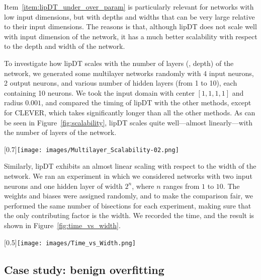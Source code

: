 \documentclass[11pt,times]{article}
\begin{document}
Item~\ref{item:lipDT_under_over_param} is particularly relevant for
networks with low input dimensions, but with depths and widths that
can be very large relative to their input dimensions. The reasons is
that, although lipDT does not scale well with input dimension of the
network, it has a much better scalability with respect to the depth
and width of the network.



To investigate how lipDT scales with the number of layers ({\ie},
depth) of the network, we generated some multilayer networks randomly
with 4 input neurons, 2 output neurons, and various number of hidden
layers (from 1 to 10), each containing 10 neurons. We took the input
domain with center $[1,1,1,1]$ and radius $0.001$, and compared the
timing of lipDT with the other methods, except for \acs{CLEVER}, which
takes significantly longer than all the other methods. As can be seen
in Figure~\ref{fig:scalability}, lipDT scales quite well---almost
linearly---with the number of layers of the network.

\begin{figure*}[t]
  \centering
  \scalebox{0.6}[0.7]{\texttt{[image: images/Multilayer\_Scalability-02.png]}} 
  \caption{lipDT scales (almost) linearly with respect to the number
    of layers.}
  \label{fig:scalability}
\end{figure*}


Similarly, lipDT exhibits an almost linear scaling with respect to the
width of the network. We ran an experiment in which we considered
networks with two input neurons and one hidden layer of width $2^n$,
where $n$ ranges from $1$ to $10$. The weights and biases were
assigned randomly, and to make the comparison fair, we performed the
same number of bisections for each experiment, making sure that the
only contributing factor is the width. We recorded the time, and the
result is shown in Figure~\ref{fig:time_vs_width}.


\begin{figure*}[t]
  \centering
  \scalebox{0.55}[0.5]{\texttt{[image: images/Time\_vs\_Width.png]}}
  \caption{lipDT scales almost linearly with respect to the width of
    the network.}
  \label{fig:time_vs_width}
\end{figure*}







\subsection{Case study: benign overfitting}
\label{subsec:Case_study_Benign_overfitting}
\end{document}
